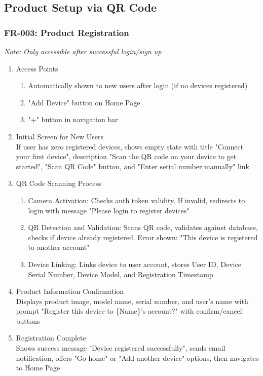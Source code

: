 \documentclass[conference]{IEEEtran}
\begin{document}
\subsection{\textbf{Product Setup via QR Code}}

\subsubsection{FR-003: Product Registration}

\textit{Note: Only accessible after successful login/sign up}

\begin{enumerate}
\item Access Points
    \begin{enumerate}
    \item Automatically shown to new users after login (if no devices registered)
    \item "Add Device" button on Home Page
    \item "+" button in navigation bar
    \end{enumerate}

\item Initial Screen for New Users\\
If user has zero registered devices, shows empty state with title "Connect your first device", description "Scan the QR code on your device to get started", "Scan QR Code" button, and "Enter serial number manually" link

\item QR Code Scanning Process
    \begin{enumerate}
    \item Camera Activation: Checks auth token validity. If invalid, redirects to login with message "Please login to register devices"
    \item QR Detection and Validation: Scans QR code, validates against database, checks if device already registered. Error shown: "This device is registered to another account"
    \item Device Linking: Links device to user account, stores User ID, Device Serial Number, Device Model, and Registration Timestamp
    \end{enumerate}

\item Product Information Confirmation\\
Displays product image, model name, serial number, and user's name with prompt "Register this device to \{Name\}'s account?" with confirm/cancel buttons

\item Registration Complete\\
Shows success message "Device registered successfully", sends email notification, offers "Go home" or "Add another device" options, then navigates to Home Page
\end{enumerate}
\end{document}

